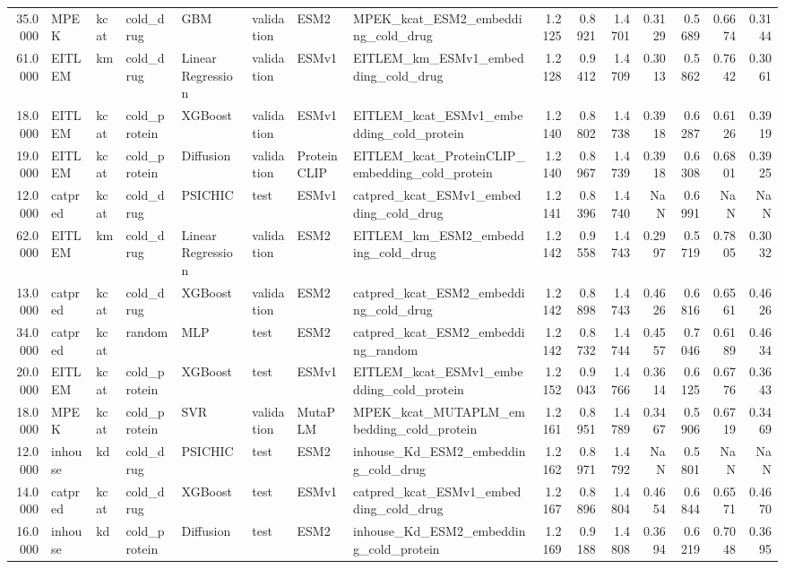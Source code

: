 \begin{tabular}{rlllllllrrrrrrr}
35.0000 & MPEK & kcat & cold_drug & GBM & validation & ESM2 & MPEK_kcat_ESM2_embedding_cold_drug & 1.2125 & 0.8921 & 1.4701 & 0.3129 & 0.5689 & 0.6674 & 0.3144 \\
61.0000 & EITLEM & km & cold_drug & Linear Regression & validation & ESMv1 & EITLEM_km_ESMv1_embedding_cold_drug & 1.2128 & 0.9412 & 1.4709 & 0.3013 & 0.5862 & 0.7642 & 0.3061 \\
18.0000 & EITLEM & kcat & cold_protein & XGBoost & validation & ESMv1 & EITLEM_kcat_ESMv1_embedding_cold_protein & 1.2140 & 0.8802 & 1.4738 & 0.3918 & 0.6287 & 0.6126 & 0.3919 \\
19.0000 & EITLEM & kcat & cold_protein & Diffusion & validation & ProteinCLIP & EITLEM_kcat_ProteinCLIP_embedding_cold_protein & 1.2140 & 0.8967 & 1.4739 & 0.3918 & 0.6308 & 0.6801 & 0.3925 \\
12.0000 & catpred & kcat & cold_drug & PSICHIC & test & ESMv1 & catpred_kcat_ESMv1_embedding_cold_drug & 1.2141 & 0.8396 & 1.4740 & NaN & 0.6991 & NaN & NaN \\
62.0000 & EITLEM & km & cold_drug & Linear Regression & validation & ESM2 & EITLEM_km_ESM2_embedding_cold_drug & 1.2142 & 0.9558 & 1.4743 & 0.2997 & 0.5719 & 0.7805 & 0.3032 \\
13.0000 & catpred & kcat & cold_drug & XGBoost & validation & ESM2 & catpred_kcat_ESM2_embedding_cold_drug & 1.2142 & 0.8898 & 1.4743 & 0.4626 & 0.6816 & 0.6561 & 0.4626 \\
34.0000 & catpred & kcat & random & MLP & test & ESM2 & catpred_kcat_ESM2_embedding_random & 1.2142 & 0.8732 & 1.4744 & 0.4557 & 0.7046 & 0.6189 & 0.4634 \\
20.0000 & EITLEM & kcat & cold_protein & XGBoost & test & ESMv1 & EITLEM_kcat_ESMv1_embedding_cold_protein & 1.2152 & 0.9043 & 1.4766 & 0.3614 & 0.6125 & 0.6776 & 0.3643 \\
18.0000 & MPEK & kcat & cold_protein & SVR & validation & MutaPLM & MPEK_kcat_MUTAPLM_embedding_cold_protein & 1.2161 & 0.8951 & 1.4789 & 0.3467 & 0.5906 & 0.6719 & 0.3469 \\
12.0000 & inhouse & kd & cold_drug & PSICHIC & test & ESM2 & inhouse_Kd_ESM2_embedding_cold_drug & 1.2162 & 0.8971 & 1.4792 & NaN & 0.5801 & NaN & NaN \\
14.0000 & catpred & kcat & cold_drug & XGBoost & test & ESMv1 & catpred_kcat_ESMv1_embedding_cold_drug & 1.2167 & 0.8896 & 1.4804 & 0.4654 & 0.6844 & 0.6571 & 0.4670 \\
16.0000 & inhouse & kd & cold_protein & Diffusion & test & ESM2 & inhouse_Kd_ESM2_embedding_cold_protein & 1.2169 & 0.9188 & 1.4808 & 0.3694 & 0.6219 & 0.7048 & 0.3695 \\

\end{tabular}
